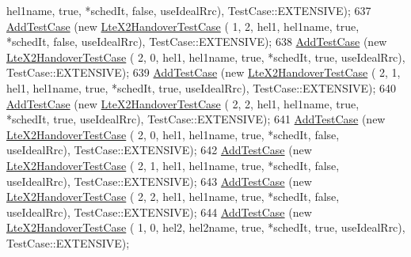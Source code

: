 \begin{DoxyCode}
      hel1name, \textcolor{keyword}{true}, *schedIt, \textcolor{keyword}{false}, useIdealRrc), TestCase::EXTENSIVE);
637           \hyperlink{classns3_1_1TestCase_a3718088e3eefd5d6454569d2e0ddd835}{AddTestCase} (\textcolor{keyword}{new} \hyperlink{classLteX2HandoverTestCase}{LteX2HandoverTestCase} (  1,    2,    hel1, 
      hel1name, \textcolor{keyword}{true}, *schedIt, \textcolor{keyword}{false}, useIdealRrc), TestCase::EXTENSIVE);
638           \hyperlink{classns3_1_1TestCase_a3718088e3eefd5d6454569d2e0ddd835}{AddTestCase} (\textcolor{keyword}{new} \hyperlink{classLteX2HandoverTestCase}{LteX2HandoverTestCase} (  2,    0,    hel1, 
      hel1name, \textcolor{keyword}{true}, *schedIt, \textcolor{keyword}{true},  useIdealRrc), TestCase::EXTENSIVE);
639           \hyperlink{classns3_1_1TestCase_a3718088e3eefd5d6454569d2e0ddd835}{AddTestCase} (\textcolor{keyword}{new} \hyperlink{classLteX2HandoverTestCase}{LteX2HandoverTestCase} (  2,    1,    hel1, 
      hel1name, \textcolor{keyword}{true}, *schedIt, \textcolor{keyword}{true},  useIdealRrc), TestCase::EXTENSIVE);
640           \hyperlink{classns3_1_1TestCase_a3718088e3eefd5d6454569d2e0ddd835}{AddTestCase} (\textcolor{keyword}{new} \hyperlink{classLteX2HandoverTestCase}{LteX2HandoverTestCase} (  2,    2,    hel1, 
      hel1name, \textcolor{keyword}{true}, *schedIt, \textcolor{keyword}{true},  useIdealRrc), TestCase::EXTENSIVE);
641           \hyperlink{classns3_1_1TestCase_a3718088e3eefd5d6454569d2e0ddd835}{AddTestCase} (\textcolor{keyword}{new} \hyperlink{classLteX2HandoverTestCase}{LteX2HandoverTestCase} (  2,    0,    hel1, 
      hel1name, \textcolor{keyword}{true}, *schedIt, \textcolor{keyword}{false}, useIdealRrc), TestCase::EXTENSIVE);
642           \hyperlink{classns3_1_1TestCase_a3718088e3eefd5d6454569d2e0ddd835}{AddTestCase} (\textcolor{keyword}{new} \hyperlink{classLteX2HandoverTestCase}{LteX2HandoverTestCase} (  2,    1,    hel1, 
      hel1name, \textcolor{keyword}{true}, *schedIt, \textcolor{keyword}{false}, useIdealRrc), TestCase::EXTENSIVE);
643           \hyperlink{classns3_1_1TestCase_a3718088e3eefd5d6454569d2e0ddd835}{AddTestCase} (\textcolor{keyword}{new} \hyperlink{classLteX2HandoverTestCase}{LteX2HandoverTestCase} (  2,    2,    hel1, 
      hel1name, \textcolor{keyword}{true}, *schedIt, \textcolor{keyword}{false}, useIdealRrc), TestCase::EXTENSIVE);
644           \hyperlink{classns3_1_1TestCase_a3718088e3eefd5d6454569d2e0ddd835}{AddTestCase} (\textcolor{keyword}{new} \hyperlink{classLteX2HandoverTestCase}{LteX2HandoverTestCase} (  1,    0,    hel2, 
      hel2name, \textcolor{keyword}{true}, *schedIt, \textcolor{keyword}{true},  useIdealRrc), TestCase::EXTENSIVE);

\end{DoxyCode}
